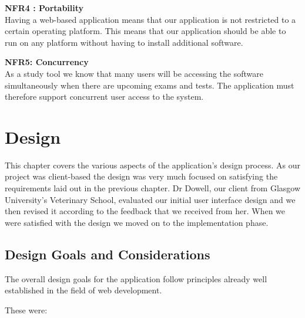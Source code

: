 \documentclass{l3proj}
\begin{document}
\textbf{ NFR4 : Portability}\\
Having a web-based application means that our application is not restricted to a certain operating platform. This means that our application should be able to run on any platform without having to install additional software.

\textbf{ NFR5: Concurrency}\\
As a study tool we know that many users will be accessing the software simultaneously when there are upcoming exams and tests. The application must therefore support concurrent user access to the system.

\chapter{Design}
\label{design}

This chapter covers the various aspects of the application's design process. As our project was client-based the design was very much focused on satisfying the requirements laid out in the previous chapter. Dr Dowell, our client from Glasgow University's Veterinary School, evaluated our initial user interface design and we then revised it according to the feedback that we received from her. When we were satisfied with the design we moved on to the implementation phase.

\section{Design Goals and Considerations}

The overall design goals for the application follow principles already well established in the field of web development.

These were:
\end{document}
